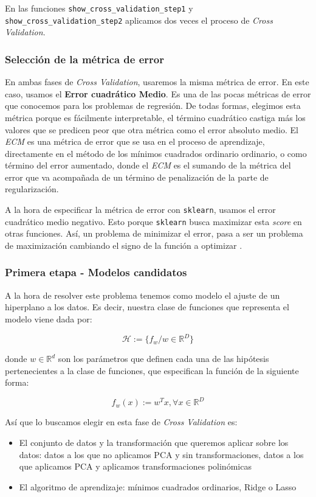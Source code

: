 \documentclass[11pt]{article}
\begin{document}
En las funciones \lstinline{show_cross_validation_step1} y \lstinline{show_cross_validation_step2} aplicamos dos veces el proceso de \emph{Cross Validation}.

\subsubsection{Selección de la métrica de error}

En ambas fases de \emph{Cross Validation}, usaremos la misma métrica de error. En este caso, usamos el \textbf{Error cuadrático Medio}. Es una de las pocas métricas de error que conocemos para los problemas de regresión. De todas formas, elegimos esta métrica porque es fácilmente interpretable, el término cuadrático castiga más los valores que se predicen peor que otra métrica como el error absoluto medio. El \emph{ECM} es una métrica de error que se usa en el proceso de aprendizaje, directamente en el método de los mínimos cuadrados ordinario ordinario, o como término del error aumentado, donde el \emph{ECM} es el sumando de la métrica del error que va acompañada de un término de penalización de la parte de regularización.

A la hora de especificar la métrica de error con \lstinline{sklearn}, usamos el error cuadrático medio negativo. Esto porque \lstinline{sklearn} busca maximizar esta \emph{score} en otras funciones. Así, un problema de minimizar el error, pasa a ser un problema de maximización cambiando el signo de la función a optimizar \cite{sklearn_neg_err:online}.

\subsubsection{Primera etapa - Modelos candidatos}

A la hora de resolver este problema tenemos como modelo el ajuste de un hiperplano a los datos. Es decir, nuestra clase de funciones que representa el modelo viene dada por:

$$\mathcal{H} := \{f_w / w \in \mathbb{R}^D\}$$

donde $w \in \mathbb{R}^d$ son los parámetros que definen cada una de las hipótesis pertenecientes a la clase de funciones, que especifican la función de la siguiente forma:

$$f_w(x):= w^T x, \forall x \in \mathbb{R}^D$$

Así que lo buscamos elegir en esta fase de \emph{Cross Validation} es:

\begin{itemize}
    \item El conjunto de datos y la transformación que queremos aplicar sobre los datos: datos a los que no aplicamos PCA y sin transformaciones, datos a los que aplicamos PCA y aplicamos transformaciones polinómicas
    \item El algoritmo de aprendizaje: mínimos cuadrados ordinarios, Ridge o Lasso
\end{itemize}
\end{document}
